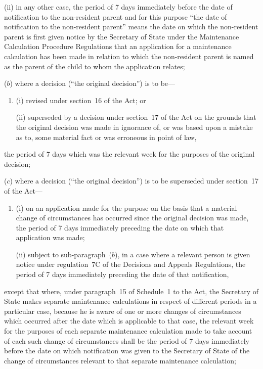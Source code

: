 \documentclass[12pt,a4paper]{article}
\begin{document}
\begin{enumerate}
\begin{enumerate}
\begin{enumerate}
(ii)
in any other case, the period of 7 days immediately before the date of notification to the non-resident parent and for this purpose “the date of notification to the non-resident parent” means the date on which the non-resident parent is first given notice by the Secretary of State under the Maintenance Calculation Procedure Regulations that an application for a maintenance calculation has been made
in relation to which the non-resident parent is named as the parent of the child to whom the application relates;
\end{enumerate}

($b$) 
where a decision (“the original decision”) is to be—
\begin{enumerate}\item[]
(i)
revised under section~16 of the Act; or

(ii)
superseded by a decision under section~17 of the Act on the grounds that the original decision was made in ignorance of, or was based upon a mistake as to, some material fact or was erroneous in point of law,
\end{enumerate}
the period of 7 days which was the relevant week for the purposes of the original decision;

($c$) 
where a decision (“the original decision”) is to be superseded under section~17 of the Act—
\begin{enumerate}\item[]
(i)
on an application made for the purpose on the basis that a material change of circumstances has occurred since the original decision was made, the period of 7 days immediately preceding the date on which that application was made;

(ii)
subject to sub-paragraph~($b$), in a case where a relevant person is given notice under regulation~7C of the Decisions and Appeals Regulations, the period of 7 days immediately preceding the date of that notification,
\end{enumerate}
except that where, under paragraph~15 of Schedule~1 to the Act, the Secretary of State makes separate maintenance calculations in respect of different periods in a particular case, because he is aware of one or more changes of circumstances which occurred after the date which is applicable to that case, the relevant week for the purposes of each separate maintenance calculation made to take account of each such change of circumstances shall be the period of 7 days immediately before the date on which notification was given to the Secretary of State of the change of circumstances relevant to that separate maintenance calculation;
\end{enumerate}


\end{enumerate}
\end{document}
